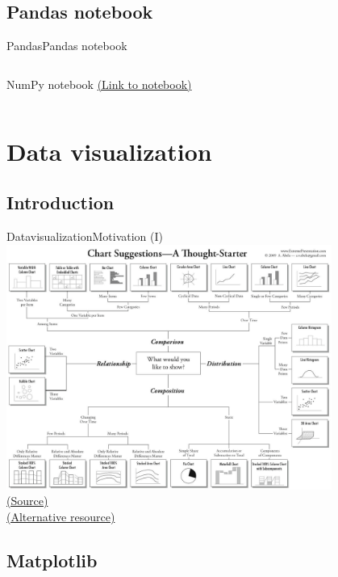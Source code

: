 \documentclass[10pt,compress]{beamer} %
\begin{document}
\subsection{Pandas notebook}
\begin{frame}{Pandas}{Pandas notebook}
    \begin{columns}
			\begin{block}{NumPy notebook}
			\href{https://github.com/dfbarrero/dataCourse/blob/master/pandas/Pandas.ipynb}{(Link to notebook)}
			\end{block}
	\end{columns}
\end{frame}

\section{Data visualization}
\subsection{Introduction}

\begin{frame}[plain]{Datavisualization}{Motivation (I)}
	\centering \includegraphics[width=0.8\textwidth]{figs/chart-selection-diagram.png}\\
	\centering \tiny \href{https://flex.bi/create-beautiful-dashboard-works/}{(Source)}\\
	\href{http://experception.net/Franconeri_ExperCeptionDotNet_ChartChooser.pdf}{(Alternative resource)}
\end{frame}


\subsection{Matplotlib}
\end{document}
